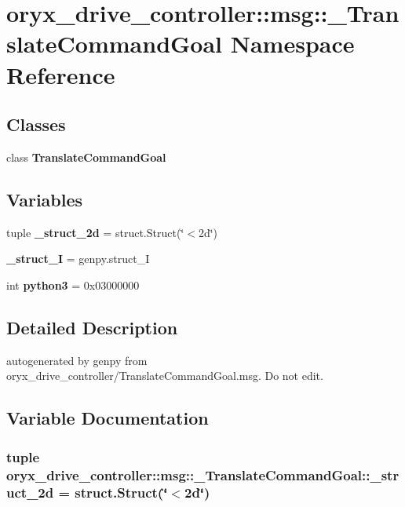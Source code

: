 \section{oryx\-\_\-drive\-\_\-controller\-:\-:msg\-:\-:\-\_\-\-Translate\-Command\-Goal \-Namespace \-Reference}
\label{namespaceoryx__drive__controller_1_1msg_1_1__TranslateCommandGoal}
\subsection*{\-Classes}
\begin{DoxyCompactItemize}
\item 
class {\bf \-Translate\-Command\-Goal}
\end{DoxyCompactItemize}
\subsection*{\-Variables}
\begin{DoxyCompactItemize}
\item 
tuple {\bf \-\_\-struct\-\_\-2d} = struct.\-Struct(\char`\"{}$<$2d\char`\"{})
\item 
{\bf \-\_\-struct\-\_\-\-I} = genpy.\-struct\-\_\-\-I
\item 
int {\bf python3} = 0x03000000
\end{DoxyCompactItemize}


\subsection{\-Detailed \-Description}
\begin{DoxyVerb}autogenerated by genpy from oryx_drive_controller/TranslateCommandGoal.msg. Do not edit.\end{DoxyVerb}
 

\subsection{\-Variable \-Documentation}
\subsubsection[{\-\_\-struct\-\_\-2d}]{\setlength{\rightskip}{0pt plus 5cm}tuple {\bf oryx\-\_\-drive\-\_\-controller\-::msg\-::\-\_\-\-Translate\-Command\-Goal\-::\-\_\-struct\-\_\-2d} = struct.\-Struct(\char`\"{}$<$2d\char`\"{})}\label{namespaceoryx__drive__controller_1_1msg_1_1__TranslateCommandGoal_a334b17e805eea359f12ae74320944a71}


